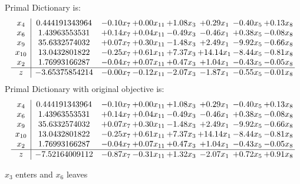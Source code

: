 \documentclass[8pt]{article}
\begin{document}
Primal Dictionary is:
\[\begin{array}{c| c c@{\hskip 2pt} c@{\hskip 2pt} c@{\hskip 2pt} c@{\hskip 2pt} c@{\hskip 2pt} c@{\hskip 2pt} }
 x_{4}   &  0.444191343964 & -0.10 x_{7} & +  0.00 x_{11} & +  1.08 x_{3} & +  0.29 x_{1} & -0.40 x_{5} & +  0.13 x_{8}\\
 x_{6}   &  1.43963553531 & +  0.14 x_{7} & +  0.04 x_{11} & -0.49 x_{3} & -0.46 x_{1} & +  0.38 x_{5} & -0.08 x_{8}\\
 x_{9}   &  35.6332574032 & +  0.07 x_{7} & +  0.30 x_{11} & -1.48 x_{3} & +  2.49 x_{1} & -9.92 x_{5} & -0.66 x_{8}\\
 x_{10}   &  13.0432801822 & -0.25 x_{7} & +  0.61 x_{11} & +  7.37 x_{3} & + 14.14 x_{1} & -8.44 x_{5} & -0.81 x_{8}\\
 x_{2}   &  1.76993166287 & -0.04 x_{7} & +  0.07 x_{11} & +  0.47 x_{3} & +  1.04 x_{1} & -0.43 x_{5} & -0.05 x_{8}\\
\hline
z    &  -3.65375854214 & -0.00 x_{7} & -0.12 x_{11} & -2.07 x_{3} & -1.87 x_{1} & -0.55 x_{5} & -0.01 x_{8}\\
\end{array}\]
Primal Dictionary with original objective is:
\[\begin{array}{c| c c@{\hskip 2pt} c@{\hskip 2pt} c@{\hskip 2pt} c@{\hskip 2pt} c@{\hskip 2pt} c@{\hskip 2pt} }
 x_{4}   &  0.444191343964 & -0.10 x_{7} & +  0.00 x_{11} & +  1.08 x_{3} & +  0.29 x_{1} & -0.40 x_{5} & +  0.13 x_{8}\\
 x_{6}   &  1.43963553531 & +  0.14 x_{7} & +  0.04 x_{11} & -0.49 x_{3} & -0.46 x_{1} & +  0.38 x_{5} & -0.08 x_{8}\\
 x_{9}   &  35.6332574032 & +  0.07 x_{7} & +  0.30 x_{11} & -1.48 x_{3} & +  2.49 x_{1} & -9.92 x_{5} & -0.66 x_{8}\\
 x_{10}   &  13.0432801822 & -0.25 x_{7} & +  0.61 x_{11} & +  7.37 x_{3} & + 14.14 x_{1} & -8.44 x_{5} & -0.81 x_{8}\\
 x_{2}   &  1.76993166287 & -0.04 x_{7} & +  0.07 x_{11} & +  0.47 x_{3} & +  1.04 x_{1} & -0.43 x_{5} & -0.05 x_{8}\\
\hline
z    &  -7.52164009112 & -0.87 x_{7} & -0.31 x_{11} & +  1.32 x_{3} & -2.07 x_{1} & +  0.72 x_{5} & +  0.91 x_{8}\\
\end{array}\]


 $ x_{3} $ enters and $ x_{6} $ leaves 
\end{document}
